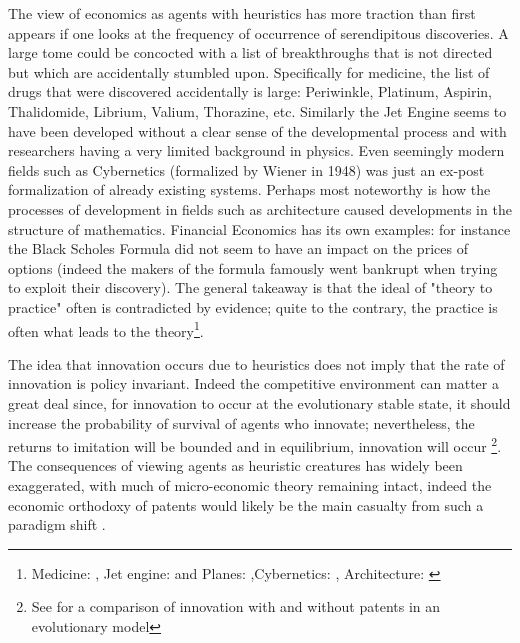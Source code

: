 \documentclass[12pt]{report}
\numberwithin{equation}{section}
\begin{document}
The view of economics as agents with heuristics has more traction than first appears if one looks at the frequency of occurrence of serendipitous discoveries. A large tome could be concocted with a list of breakthroughs that is not directed but which are accidentally stumbled upon. Specifically for medicine, the list of drugs that were discovered accidentally is large: Periwinkle, Platinum, Aspirin, Thalidomide, Librium, Valium, Thorazine, etc. Similarly the Jet Engine seems to have been developed without a clear sense of the developmental process and with researchers having a very limited background in physics. Even seemingly modern fields such as Cybernetics (formalized by Wiener in 1948) was just an ex-post formalization of already existing systems. Perhaps most noteworthy is how the processes of development in fields such as architecture caused developments in the structure of mathematics. Financial Economics has its own examples: for instance the Black Scholes Formula did not seem to have an impact on the prices of options (indeed the makers of the formula famously went bankrupt when trying to exploit their discovery). The general takeaway is that the ideal of "theory to practice" often is contradicted by evidence; quite to the contrary, the practice is often what leads to the theory\footnote{ Medicine: \cite{meyers2007happy}, Jet engine: \cite{scranton2006urgency} and Planes: \cite{meyer2013airplane},Cybernetics: \cite{mindell2002between}, Architecture: \cite{unguru1992guy}}.

The idea that innovation occurs due to heuristics does not imply that the rate of innovation is policy invariant. Indeed the competitive environment can matter a great deal since, for innovation to occur at the evolutionary stable state, it should increase the probability of survival of agents who innovate; nevertheless, the returns to imitation will be bounded and in equilibrium, innovation will occur \footnote{See \cite{Winter1993} for a comparison of innovation with and without patents in an evolutionary model}. The consequences of viewing agents as heuristic creatures has widely been exaggerated, with much of micro-economic theory remaining intact, indeed the economic orthodoxy of patents would likely be the main casualty from such a paradigm shift \cite{becker1962irrational}.


\end{document}
